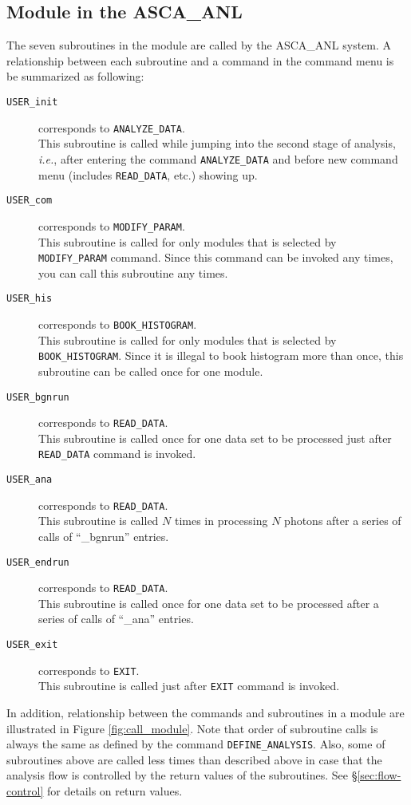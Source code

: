 \subsection{Module in the ASCA\_ANL}
The seven subroutines in the module
are called by the ASCA\_ANL system.
A relationship between each subroutine
and a command in the command menu is be summarized as following:
\begin{description}
  \item[{\tt USER\_init}] corresponds to {\tt ANALYZE\_DATA}. \\
	This subroutine is called
	while jumping into the second stage of analysis,
	{\em i.e.},
	after entering the command {\tt ANALYZE\_DATA}
	and before new command menu (includes {\tt READ\_DATA}, etc.)
	showing up.
  \item[{\tt USER\_com}] corresponds to {\tt MODIFY\_PARAM}. \\
	This subroutine is called for only modules
	that is selected by {\tt MODIFY\_PARAM} command.
	Since this command can be invoked any times,
	you can call this subroutine any times.
  \item[{\tt USER\_his}] corresponds to {\tt BOOK\_HISTOGRAM}. \\
	This subroutine is called for only modules
	that is selected by {\tt BOOK\_HISTOGRAM}.
	Since it is illegal to book histogram more than once,
	this subroutine can be called once for one module.
  \item[{\tt USER\_bgnrun}] corresponds to {\tt READ\_DATA}. \\
	This subroutine is called once for one data set to be processed
	just after {\tt READ\_DATA} command is invoked.
  \item[{\tt USER\_ana}] corresponds to {\tt READ\_DATA}. \\
	This subroutine is called $N$ times in processing $N$ photons
	after a series of calls of ``\_bgnrun'' entries.
  \item[{\tt USER\_endrun}] corresponds to {\tt READ\_DATA}. \\
	This subroutine is called once for one data set to be processed
	after a series of calls of ``\_ana'' entries.
  \item[{\tt USER\_exit}] corresponds to {\tt EXIT}. \\
	This subroutine is called
	just after {\tt EXIT} command is invoked.
\end{description}
In addition,
relationship between the commands and subroutines in a module
are illustrated in Figure \ref{fig:call_module}.
Note that
order of subroutine calls is always the same
as defined by the command {\tt DEFINE\_ANALYSIS}.
Also,
some of subroutines above are called less times than described above
in case that
the analysis flow is controlled by the return values of the subroutines.
See \S \ref{sec:flow-control} for details on return values.

